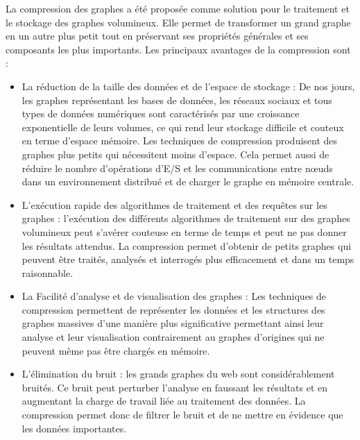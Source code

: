 La compression des graphes a été proposée comme solution pour le traitement et le stockage des graphes volumineux. Elle permet de transformer un grand graphe en un autre plus petit tout en préservant ses propriétés générales et ses composants les plus importants.
Les principaux avantages de la compression sont  \citep{liu2018graph} :
\begin{itemize}

\item La réduction de la taille des données et de l'espace de stockage : De nos jours, les graphes représentant les bases de données, les réseaux sociaux et tous types de données numériques sont caractérisés par une croissance exponentielle de leurs volumes, ce qui rend leur stockage difficile et couteux en terme d'espace mémoire. Les techniques de compression produisent des graphes plus petits qui nécessitent moins d'espace. Cela permet aussi de réduire le nombre d'opérations d'E/S et les communications entre nœuds dans un environnement distribué et de charger le graphe en mémoire centrale.   

\item L'exécution rapide des algorithmes de traitement et des requêtes sur les graphes : l'exécution des différents algorithmes de traitement sur des graphes volumineux peut s'avérer couteuse en terme de temps et peut ne pas donner les résultats attendus. La compression permet d'obtenir de petits graphes qui peuvent être traités, analysés et interrogés plus efficacement et dans un temps raisonnable. 
  
\item La Facilité d'analyse et de visualisation des graphes : Les techniques de compression permettent de représenter les données et les structures des graphes massives d'une manière plus significative permettant ainsi leur analyse et leur visualisation contrairement au graphes d'origines qui ne peuvent même pas être chargés en mémoire.  

\item L'élimination du bruit : les grands graphes du web sont considérablement bruités. Ce bruit peut perturber l'analyse en faussant les résultats et en augmentant la charge de travail liée au traitement des données. La compression permet donc de filtrer le bruit et de ne mettre en évidence que les données importantes.

\end{itemize}


